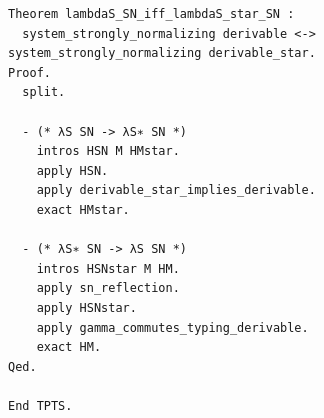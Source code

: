 \begin{latin}
\begin{verbatim}
Theorem lambdaS_SN_iff_lambdaS_star_SN :
  system_strongly_normalizing derivable <-> system_strongly_normalizing derivable_star.
Proof.
  split.

  - (* λS SN -> λS∗ SN *)
    intros HSN M HMstar.
    apply HSN.
    apply derivable_star_implies_derivable.
    exact HMstar.

  - (* λS∗ SN -> λS SN *)
    intros HSNstar M HM.
    apply sn_reflection.
    apply HSNstar.
    apply gamma_commutes_typing_derivable.
    exact HM.
Qed.

End TPTS.
\end{verbatim}
\end{latin}
